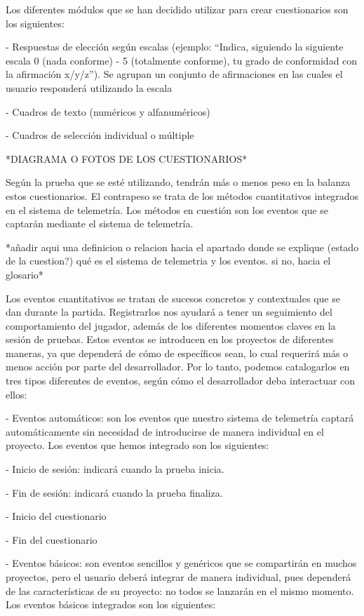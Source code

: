 Los diferentes módulos que se han decidido utilizar para crear cuestionarios son los siguientes:

- Respuestas de elección según escalas (ejemplo: “Indica, siguiendo la siguiente escala 0 (nada conforme) - 5 (totalmente conforme), tu grado de conformidad con la afirmación x/y/z”). Se agrupan un conjunto de afirmaciones en las cuales el usuario responderá utilizando la escala

- Cuadros de texto (numéricos y alfanuméricos)

- Cuadros de selección individual o múltiple

*DIAGRAMA O FOTOS DE LOS CUESTIONARIOS*

Según la prueba que se esté utilizando, tendrán más o menos peso en la balanza estos cuestionarios. El contrapeso se trata de los métodos cuantitativos integrados en el sistema de telemetría. Los métodos en cuestión son los eventos que se captarán mediante el sistema de telemetría.

*añadir aqui una definicion o relacion hacia el apartado donde se explique (estado de la cuestion?) qué es el sistema de telemetria y los eventos. si no, hacia el glosario*

Los eventos cuantitativos se tratan de sucesos concretos y contextuales que se dan durante la partida. Registrarlos nos ayudará a tener un seguimiento del comportamiento del jugador, además de los diferentes momentos claves en la sesión de pruebas. Estos eventos se introducen en los proyectos de diferentes maneras, ya que dependerá de cómo de específicos sean, lo cual requerirá más o menos acción por parte del desarrollador. Por lo tanto, podemos catalogarlos en tres tipos diferentes de eventos, según cómo el desarrollador deba interactuar con ellos:

- Eventos automáticos: son los eventos que nuestro sistema de telemetría captará automáticamente sin necesidad de introducirse de manera individual en el proyecto. Los eventos que hemos integrado son los siguientes:
    
    - Inicio de sesión: indicará cuando la prueba inicia.

    - Fin de sesión: indicará cuando la prueba finaliza.

    - Inicio del cuestionario

    - Fin del cuestionario

- Eventos básicos: son eventos sencillos y genéricos que se compartirán en muchos proyectos, pero el usuario deberá integrar de manera individual, pues dependerá de las características de su proyecto: no todos se lanzarán en el mismo momento. Los eventos básicos integrados son los siguientes:
    
